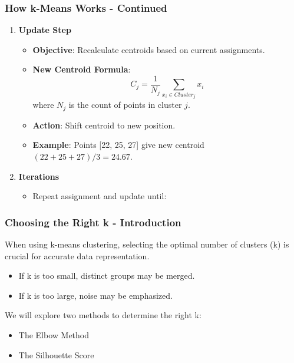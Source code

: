 \documentclass[aspectratio=169]{beamer}
\begin{document}
\begin{frame}[fragile]
    \frametitle{How k-Means Works - Continued}
    \begin{enumerate}[resume]
        \item \textbf{Update Step}
        \begin{itemize}
            \item \textbf{Objective}: Recalculate centroids based on current assignments.
            \item \textbf{New Centroid Formula}:
            \begin{equation}
                C_j = \frac{1}{N_j} \sum_{x_i \in Cluster_j} x_i
            \end{equation}
            where \(N_j\) is the count of points in cluster \(j\).
            \item \textbf{Action}: Shift centroid to new position.
            \item \textbf{Example}: Points [22, 25, 27] give new centroid \((22 + 25 + 27) / 3 = 24.67\).
        \end{itemize}

        \item \textbf{Iterations}
        \begin{itemize}
            \item Repeat assignment and update until:
            \begin{itemize}
                \item Centroids stabilize or }
                \item Maximum iterations reached.
            \end{itemize}
        \end{itemize}
    \end{enumerate}
\end{frame}

\begin{frame}[fragile]
    \frametitle{Choosing the Right k - Introduction}
    When using k-means clustering, selecting the optimal number of clusters (k) is crucial for accurate data representation. 
    \begin{itemize}
        \item If k is too small, distinct groups may be merged.
        \item If k is too large, noise may be emphasized.
    \end{itemize}
    We will explore two methods to determine the right k:
    \begin{itemize}
        \item The Elbow Method
        \item The Silhouette Score
    \end{itemize}
\end{frame}
\end{document}
